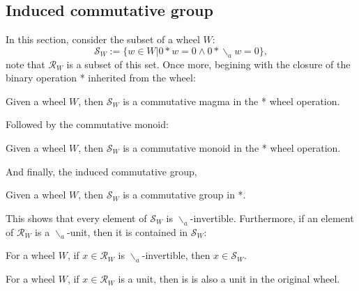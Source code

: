 \subsection{Induced commutative group}
In this section, consider the subset of a wheel $W$:
\[
  \mathcal{S}_{W} := \{ w \in W | 0*w = 0 \wedge 0*\backslash_{a}w = 0 \},
\]
note that $\mathcal{R}_{W}$ is a subset of this set. Once more, begining with the closure of the binary operation *
inherited from the wheel:
\begin{definition}
  \leanok
  Given a wheel $W$, then $\mathcal{S}_{W}$ is a commutative magma in the * wheel operation.
\end{definition}
Followed by the commutative monoid:
\begin{definition}
  \leanok
  Given a wheel $W$, then $\mathcal{S}_{W}$ is a commutative monoid in the * wheel operation.
\end{definition}
And finally, the induced commutative group,
\begin{definition}
  \leanok
  Given a wheel $W$, then $\mathcal{S}_{W}$ is a commutative group in *.
\end{definition}
This shows that every element of $\mathcal{S}_{W}$ is $\backslash_{a}$-invertible. Furthermore, if an element of $\mathcal{R}_{W}$ 
is a $\backslash_{a}$-unit, then it is contained in $\mathcal{S}_{W}$:
\begin{proposition}
  \leanok
  For a wheel $W$, if $x \in \mathcal{R}_{W}$ is $\backslash_{a}$-invertible, then $x \in \mathcal{S}_{W}$.
\end{proposition}
\begin{proposition}
  \leanok
  For a wheel $W$, if $x \in \mathcal{R}_{W}$ is a unit, then is is also a unit in the original wheel.
\end{proposition}
